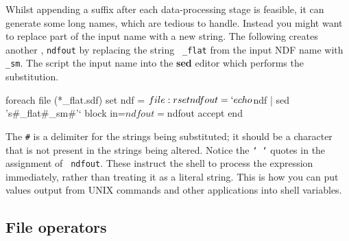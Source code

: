 \documentclass[twoside,11pt,nolof]{starlink}
\begin{document}
Whilst appending a suffix after each data-processing stage is
feasible, it can generate some long names, which are tedious to
handle.  Instead you might want to replace part of the input name with
a new string.  The following creates another , \texttt{ndfout} by replacing the string {\tt
\_flat} from the input NDF name with \texttt{\_sm}.  The script
 the input name into the \textbf{sed}
editor which performs the substitution.

\begin{small}
\begin{terminalv}
     foreach file (*_flat.sdf)
        set ndf = $file:r
        set ndfout = `echo $ndf | sed 's#_flat#_sm#'`
        block in=$ndf out=$ndfout accept
     end
\end{terminalv}
\end{small}
The \texttt{\#} is a delimiter for the strings being substituted; it
should be a character that is not present in the strings being
altered.  Notice the \texttt{` `} quotes in the assignment of {\tt
ndfout}.  These instruct the shell to process the expression
immediately, rather than treating it as a literal string.  This is how
you can put values output from UNIX commands and other applications into
shell variables.

\subsection{File operators
\label{sc4_se_file_operators}}
\end{document}
